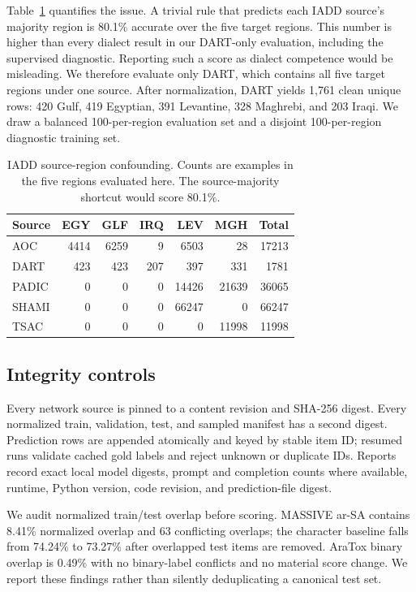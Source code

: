 \documentclass[10pt,twocolumn]{article}
\begin{document}
Table~\ref{tab:source} quantifies the issue. A trivial rule that predicts each
IADD source's majority region is 80.1\% accurate over the five target regions.
This number is higher than every dialect result in our DART-only evaluation,
including the supervised diagnostic. Reporting such a score as dialect
competence would be misleading. We therefore evaluate only DART, which contains
all five target regions under one source. After normalization, DART yields
1,761 clean unique rows: 420 Gulf, 419 Egyptian, 391 Levantine, 328 Maghrebi,
and 203 Iraqi. We draw a balanced 100-per-region evaluation set and a disjoint
100-per-region diagnostic training set.

\begin{table}[t]
\centering
\small
\caption{IADD source-region confounding. Counts are examples in the five
regions evaluated here. The source-majority shortcut would score 80.1\%.}
\label{tab:source}
\begin{tabular}{lrrrrrr}
\toprule
Source & EGY & GLF & IRQ & LEV & MGH & Total \\
\midrule
AOC & 4414 & 6259 & 9 & 6503 & 28 & 17213 \\
DART & 423 & 423 & 207 & 397 & 331 & 1781 \\
PADIC & 0 & 0 & 0 & 14426 & 21639 & 36065 \\
SHAMI & 0 & 0 & 0 & 66247 & 0 & 66247 \\
TSAC & 0 & 0 & 0 & 0 & 11998 & 11998 \\
\bottomrule
\end{tabular}
\end{table}

\subsection{Integrity controls}
Every network source is pinned to a content revision and SHA-256 digest. Every
normalized train, validation, test, and sampled manifest has a second digest.
Prediction rows are appended atomically and keyed by stable item ID; resumed
runs validate cached gold labels and reject unknown or duplicate IDs. Reports
record exact local model digests, prompt and completion counts where available,
runtime, Python version, code revision, and prediction-file digest.

We audit normalized train/test overlap before scoring. MASSIVE ar-SA contains
8.41\% normalized overlap and 63 conflicting overlaps; the character baseline
falls from 74.24\% to 73.27\% after overlapped test items are removed. AraTox
binary overlap is 0.49\% with no binary-label conflicts and no material score
change. We report these findings rather than silently deduplicating a canonical
test set.
\end{document}
